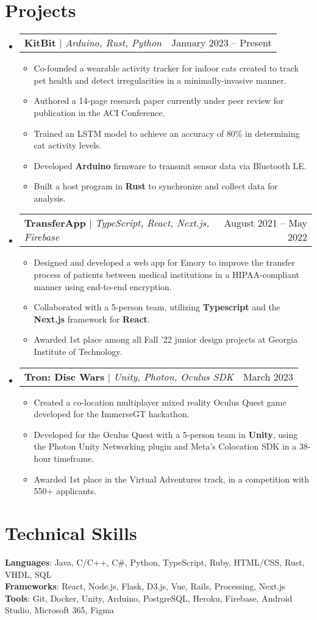 \documentclass[letterpaper,11pt]{article}
\makeatletter
\newcommand{\resumeItem}[1]{
  \item\small{
    {#1 \vspace{-2pt}}
  }
}
\newcommand{\resumeProjectHeading}[2]{
    \item
    \begin{tabular*}{0.97\textwidth}{l@{\extracolsep{\fill}}r}
      \small#1 & #2 \\
    \end{tabular*}\vspace{-7pt}
}
\newcommand{\resumeSubHeadingListStart}{\begin{itemize}[leftmargin=0.15in, label={}]}
\newcommand{\resumeSubHeadingListEnd}{\end{itemize}}
\newcommand{\resumeItemListStart}{\begin{itemize}}
\newcommand{\resumeItemListEnd}{\end{itemize}\vspace{-5pt}}
\makeatother
\begin{document}
\section{Projects}
    \resumeSubHeadingListStart
    \resumeProjectHeading
          {\textbf{KitBit} $|$ \emph{Arduino, Rust, Python}}{January 2023 -- Present}
          \resumeItemListStart
                      \resumeItem{Co-founded a wearable activity tracker for indoor cats created to track pet health and detect irregularities in a minimally-invasive manner.}
            \resumeItem{Authored a 14-page research paper currently under peer review for publication in the ACI Conference.}
             \resumeItem{Trained an LSTM model to achieve an accuracy of 80\% in determining cat activity levels.}
            \resumeItem{Developed \textbf{Arduino} firmware to transmit sensor data via Bluetooth LE.}
            \resumeItem{Built a host program in \textbf{Rust} to synchronize and collect data for analysis.}
          \resumeItemListEnd
      \resumeProjectHeading
          {\textbf{TransferApp} $|$ \emph{TypeScript, React, Next.js, Firebase}}{August 2021 -- May 2022}
          \resumeItemListStart
            \resumeItem{Designed and developed a web app for Emory to improve the transfer process of patients between medical institutions in a HIPAA-compliant manner using end-to-end encryption.}
                        \resumeItem{Collaborated with a 5-person team, utilizing \textbf{Typescript} and the \textbf{Next.js} framework for \textbf{React}.}
            \resumeItem{Awarded 1st place among all Fall ’22 junior design projects at Georgia Institute of Technology.}
          \resumeItemListEnd
      \resumeProjectHeading
          {\textbf{Tron: Disc Wars} $|$ \emph{Unity, Photon, Oculus SDK}}{March 2023}
          \resumeItemListStart
            \resumeItem{Created a co-location multiplayer mixed reality Oculus Quest game developed for the ImmerseGT hackathon.}
                        \resumeItem{Developed for the Oculus Quest with a 5-person team in \textbf{Unity}, using the Photon Unity
Networking plugin and Meta’s Colocation SDK in a 38-hour timeframe.}
                        \resumeItem{Awarded 1st place in the Virtual Adventures track, in a competition with 550+ applicants.}
          \resumeItemListEnd
    \resumeSubHeadingListEnd



%
\section{Technical Skills}
 \begin{itemize}[leftmargin=0.15in, label={}]
    \small{\item{
     \textbf{Languages}{: Java, C/C++, C\#, Python, TypeScript, Ruby, HTML/CSS, Rust, VHDL, SQL} \\
     \textbf{Frameworks}{: React, Node.js, Flask, D3.js, Vue, Rails, Processing, Next.js} \\
     \textbf{Tools}{: Git, Docker, Unity, Arduino, PostgreSQL, Heroku, Firebase, Android Studio, Microsoft 365, Figma} \\
    }}
 \end{itemize}


\end{document}
